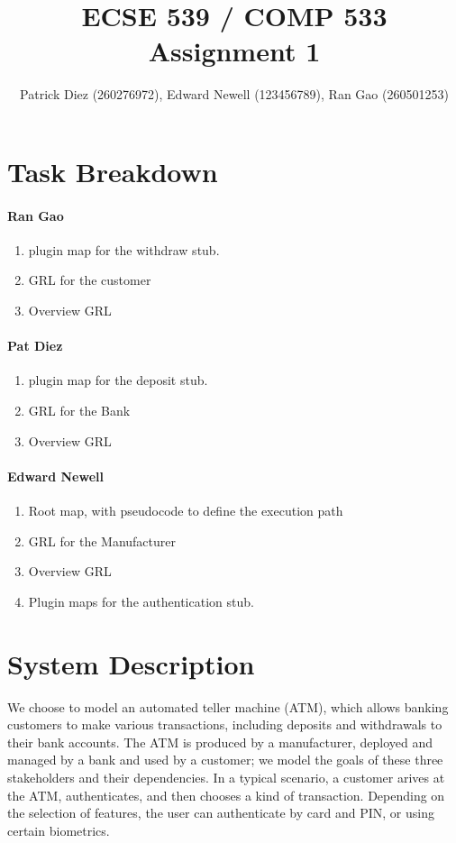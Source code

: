\documentclass[10pt,fleqn]{article}
\title{ECSE 539 / COMP 533 Assignment 1}
\author{Patrick Diez (260276972), Edward Newell (123456789), Ran Gao (260501253)}
\begin{document}
\maketitle                              %


\section{Task Breakdown}
\paragraph{\textbf{Ran Gao}}
	\begin{enumerate}
		\item{plugin map for the withdraw stub.}
		\item{GRL for the customer}
		\item{Overview GRL}
	\end{enumerate}

\paragraph{\textbf{Pat Diez}}
	\begin{enumerate}
		\item{plugin map for the deposit stub.}
		\item{GRL for the Bank}
		\item{Overview GRL}
	\end{enumerate} 

\paragraph{\textbf{Edward Newell}}
	\begin{enumerate}
		\item{Root map, with pseudocode to define the execution path}
		\item{GRL for the Manufacturer}
		\item{Overview GRL}
		\item{Plugin maps for the authentication stub.}
	\end{enumerate}

\section{System Description}
We choose to model an automated teller machine (ATM), which allows banking
customers to make various transactions, including deposits and withdrawals to
their bank accounts.  The ATM is produced by a manufacturer, deployed and 
managed by a bank and used by a customer; we model the goals of these three 
stakeholders and their dependencies.  In a typical scenario, a customer
arives at the ATM, authenticates, and then chooses a kind of transaction.
Depending on the selection of features, the user can authenticate by card and
PIN, or using certain biometrics.  
\end{document}
